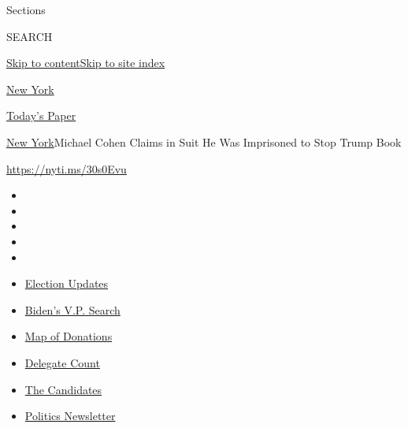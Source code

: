 Sections

SEARCH

\protect\hyperlink{site-content}{Skip to
content}\protect\hyperlink{site-index}{Skip to site index}

\href{https://www.nytimes.com/section/nyregion}{New York}

\href{https://myaccount.nytimes.com/auth/login?response_type=cookie\&client_id=vi}{}

\href{https://www.nytimes.com/section/todayspaper}{Today's Paper}

\href{/section/nyregion}{New York}\textbar{}Michael Cohen Claims in Suit
He Was Imprisoned to Stop Trump Book

\url{https://nyti.ms/30s0Evu}

\begin{itemize}
\item
\item
\item
\item
\item
\end{itemize}

\begin{itemize}
\item
  \href{https://www.nytimes.com/2020/08/03/us/elections/biden-vs-trump.html?action=click\&pgtype=Article\&state=default\&region=TOP_BANNER\&context=storylines_menu}{Election
  Updates}
\item
  \href{https://www.nytimes.com/article/biden-vice-president-2020.html?action=click\&pgtype=Article\&state=default\&region=TOP_BANNER\&context=storylines_menu}{Biden's
  V.P. Search}
\item
  \href{https://www.nytimes.com/interactive/2020/07/24/us/politics/trump-biden-campaign-donors.html?action=click\&pgtype=Article\&state=default\&region=TOP_BANNER\&context=storylines_menu}{Map
  of Donations}
\item
  \href{https://www.nytimes.com/interactive/2020/us/elections/delegate-count-primary-results.html?action=click\&pgtype=Article\&state=default\&region=TOP_BANNER\&context=storylines_menu}{Delegate
  Count}
\item
  \href{https://www.nytimes.com/interactive/2019/us/politics/2020-presidential-candidates.html?action=click\&pgtype=Article\&state=default\&region=TOP_BANNER\&context=storylines_menu}{The
  Candidates}
\item
  \href{https://www.nytimes.com/newsletters/politics?action=click\&pgtype=Article\&state=default\&region=TOP_BANNER\&context=storylines_menu}{Politics
  Newsletter}
\end{itemize}

